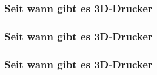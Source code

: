 \begin{frame}
  \frametitle{Seit wann gibt es 3D-Drucker}
\end{frame}
{
\begin{frame}
  \frametitle{Seit wann gibt es 3D-Drucker}
\end{frame}
}
{
\begin{frame}
  \frametitle{Seit wann gibt es 3D-Drucker}
\end{frame}
}
